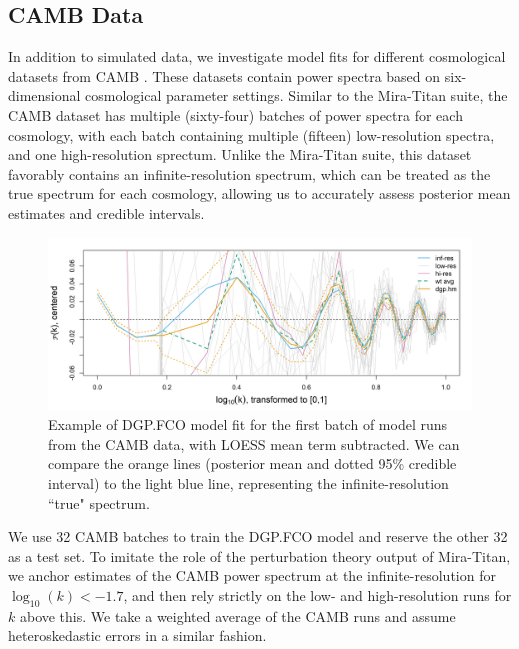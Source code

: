 \documentclass[11pt]{article}
\begin{document}
\subsection{CAMB Data}
\label{subsec:camb}

In addition to simulated data, we investigate model fits for different cosmological 
datasets from CAMB \citep{lewis2011CAMB}. These datasets contain power spectra based
on six-dimensional cosmological parameter settings. Similar to the Mira-Titan suite, the
CAMB dataset has multiple (sixty-four) batches of power spectra for each cosmology, with each batch 
containing multiple (fifteen) low-resolution spectra, and one high-resolution sprectum. 
Unlike the Mira-Titan suite, this dataset favorably contains an infinite-resolution 
spectrum, which can be treated as the true spectrum for each cosmology,
allowing us to accurately assess posterior mean estimates and credible intervals. 

\begin{figure}
    \centering
    \includegraphics[width=\textwidth]{CAMB_fit_model1.png}
    \caption{Example of DGP.FCO model fit for the first batch of model runs from the CAMB data, 
             with LOESS mean term subtracted. We can compare the orange lines 
             (posterior mean and dotted 95\% credible interval) to the light blue line,
             representing the infinite-resolution ``true" spectrum.}   
    \label{fig:fit_camb}
\end{figure}

We use 32 CAMB batches to train the DGP.FCO model and reserve the other 32 as a test set.
To imitate the role of the perturbation theory output of Mira-Titan, we anchor estimates of the CAMB
power spectrum at the infinite-resolution for $\log_{10}(k) < -1.7$, and then rely 
strictly on the low- and high-resolution runs for $k$ above this. We take a weighted
average of the CAMB runs and assume heteroskedastic errors in a similar fashion. 
\end{document}

